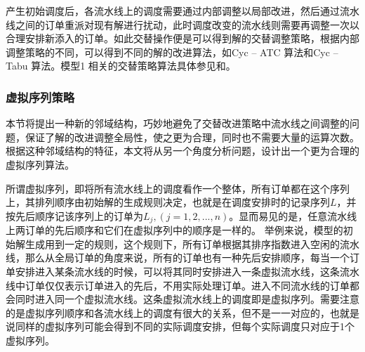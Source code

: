 产生初始调度后，各流水线上的调度需要通过内部调整以局部改进，然后通过流水线之间的订单重派对现有解进行扰动，此时调度改变的流水线则需要再调整一次以合理安排新添入的订单。如此交替操作便是可以得到解的交替调整策略，根据内部调整策略的不同，可以得到不同的解的改进算法，如Cyc -- ATC 算法和Cyc -- Tabu 算法。模型1 相关的交替策略算法具体参见和。

\subsubsection{虚拟序列策略}
本节将提出一种新的邻域结构，巧妙地避免了交替改进策略中流水线之间调整的问题，保证了解的改进调整全局性，使之更为合理，同时也不需要大量的运算次数。
根据这种邻域结构的特征，本文将从另一个角度分析问题，设计出一个更为合理的虚拟序列算法。

所谓虚拟序列，即将所有流水线上的调度看作一个整体，所有订单都在这个序列上，其排列顺序由初始解的生成规则决定，也就是在调度安排时的记录序列$L$，并按先后顺序记该序列上的订单为$L_j, (j = 1,2,...,n)$。显而易见的是，任意流水线上两订单的先后顺序和它们在虚拟序列中的顺序是一样的。
举例来说，模型的初始解生成用到一定的规则，这个规则下，所有订单根据其排序指数进入空闲的流水线，那么从全局订单的角度来说，所有的订单也有一种先后安排顺序，每当一个订单安排进入某条流水线的时候，可以将其同时安排进入一条虚拟流水线，这条流水线中订单仅仅表示订单进入的先后，不用实际处理订单。进入不同流水线的订单都会同时进入同一个虚拟流水线。这条虚拟流水线上的调度即是虚拟序列。需要注意的是虚拟序列顺序和各流水线上的调度有很大的关系，但不是一一对应的，也就是说同样的虚拟序列可能会得到不同的实际调度安排，但每个实际调度只对应于1个虚拟序列。

